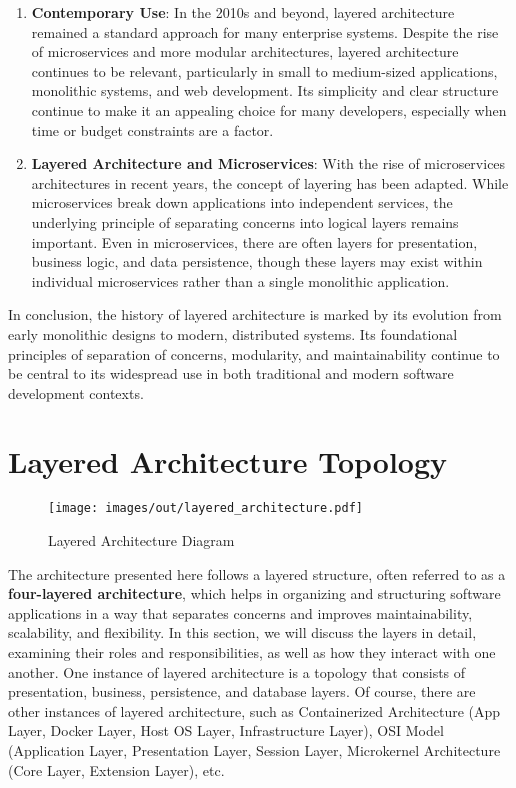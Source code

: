 \begin{enumerate}
	\item \textbf{Contemporary Use}: 
	In the 2010s and beyond, layered architecture remained a standard approach for many enterprise systems. Despite the rise of microservices and more modular architectures, layered architecture continues to be relevant, particularly in small to medium-sized applications, monolithic systems, and web development. Its simplicity and clear structure continue to make it an appealing choice for many developers, especially when time or budget constraints are a factor.
	
	\item \textbf{Layered Architecture and Microservices}: 
	With the rise of microservices architectures in recent years, the concept of layering has been adapted. While microservices break down applications into independent services, the underlying principle of separating concerns into logical layers remains important. Even in microservices, there are often layers for presentation, business logic, and data persistence, though these layers may exist within individual microservices rather than a single monolithic application.
\end{enumerate}

In conclusion, the history of layered architecture is marked by its evolution from early monolithic designs to modern, distributed systems. Its foundational principles of separation of concerns, modularity, and maintainability continue to be central to its widespread use in both traditional and modern software development contexts.


\section{Layered Architecture Topology}

\begin{figure}[ht]
	\centering
	\texttt{[image: images/out/layered\_architecture.pdf]}
	\caption{Layered Architecture Diagram}
	\label{fig:layered_architecture}
\end{figure}

The architecture presented here follows a layered structure, often referred to as a \textbf{four-layered architecture}, which helps in organizing and structuring software applications in a way that separates concerns and improves maintainability, scalability, and flexibility. In this section, we will discuss the layers in detail, examining their roles and responsibilities, as well as how they interact with one another. One instance of layered architecture is a topology that consists of presentation, business, persistence, and database layers. Of course, there are other instances of layered architecture, such as Containerized Architecture (App Layer, Docker Layer, Host OS Layer, Infrastructure Layer), OSI Model (Application Layer, Presentation Layer, Session Layer, Microkernel Architecture (Core Layer, Extension Layer), etc.

